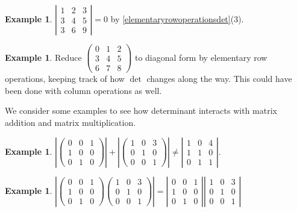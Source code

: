 \documentclass[12pt]{amsart}
\theoremstyle{definition}
\newtheorem{example}[theorem]{Example}
\begin{document}
\begin{example}\label{}$\left\vert \begin{array}{ccc} 1 & 2 & 3 \\ 3 & 4 & 5 \\ 3 & 6 & 9 \end{array}\right\vert = 0$ by \ref{elementaryrowoperationsdet}(3).
\end{example}

\begin{example}\label{} Reduce $\left(\begin{array}{ccc} 0 & 1 & 2 \\ 3 & 4 & 5 \\ 6 & 7 & 8 \end{array}\right)$ to diagonal form by elementary row operations, keeping track of how $\det$ changes along the way. This could have been done with column operations as well.
\end{example}

We consider some examples to see how determinant interacts with matrix addition and matrix multiplication.

\begin{example}\label{} $\left\vert \left(\begin{array}{ccc} 0 & 0 & 1 \\ 1 & 0 & 0 \\ 0 & 1 & 0 \end{array}\right) \right\vert + \left\vert \left(\begin{array}{ccc} 1 & 0 & 3 \\ 0 & 1 & 0 \\ 0 & 0 & 1 \end{array}\right) \right\vert \neq \left\vert \begin{array}{ccc} 1 & 0 & 4 \\ 1 & 1 & 0 \\ 0 & 1 & 1 \end{array}\right\vert$.
\end{example}

\begin{example}\label{} $\left\vert \left(\begin{array}{ccc} 0 & 0 & 1 \\ 1 & 0 & 0 \\ 0 & 1 & 0 \end{array}\right) \left(\begin{array}{ccc} 1 & 0 & 3 \\ 0 & 1 & 0 \\ 0 & 0 & 1 \end{array}\right) \right\vert = \left\vert \begin{array}{ccc} 0 & 0 & 1 \\ 1 & 0 & 0 \\ 0 & 1 & 0 \end{array}\right\vert \left\vert \begin{array}{ccc} 1 & 0 & 3 \\ 0 & 1 & 0 \\ 0 & 0 & 1 \end{array} \right\vert $
\end{example}
\end{document}
